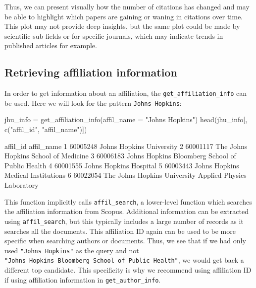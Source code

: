 Thus, we can present visually how the number of citations has changed
and may be able to highlight which papers are gaining or waning in
citations over time. This plot may not provide deep insights, but the
same plot could be made by scientific sub-fields or for specific
journals, which may indicate trends in published articles for example.

\hypertarget{retrieving-affiliation-information}{%
\subsection{Retrieving affiliation
information}\label{retrieving-affiliation-information}}

In order to get information about an affiliation, the
\texttt{get\_affiliation\_info} can be used. Here we will look for the
pattern \texttt{Johns\ Hopkins}:

\begin{Schunk}
\begin{Sinput}
jhu_info = get_affiliation_info(affil_name = "Johns Hopkins")
head(jhu_info[, c("affil_id", "affil_name")])
\end{Sinput}
\begin{Soutput}
  affil_id                                              affil_name
1 60005248                                Johns Hopkins University
2 60001117                    The Johns Hopkins School of Medicine
3 60006183         Johns Hopkins Bloomberg School of Public Health
4 60001555                                  Johns Hopkins Hospital
5 60003443                      Johns Hopkins Medical Institutions
6 60022054 The Johns Hopkins University Applied Physics Laboratory
\end{Soutput}
\end{Schunk}

This function implicitly calls \texttt{affil\_search}, a lower-level
function which searches the affiliation information from Scopus.
Additional information can be extracted using \texttt{affil\_search},
but this typically includes a large number of records as it searches all
the documents. This affiliation ID again can be used to be more specific
when searching authors or documents. Thus, we see that if we had only
used \texttt{"Johns\ Hopkins"} as the query and not
\texttt{"Johns\ Hopkins\ Bloomberg\ School\ of\ Public\ Health"}, we
would get back a different top candidate. This specificity is why we
recommend using affiliation ID if using affiliation information in
\texttt{get\_author\_info}.

